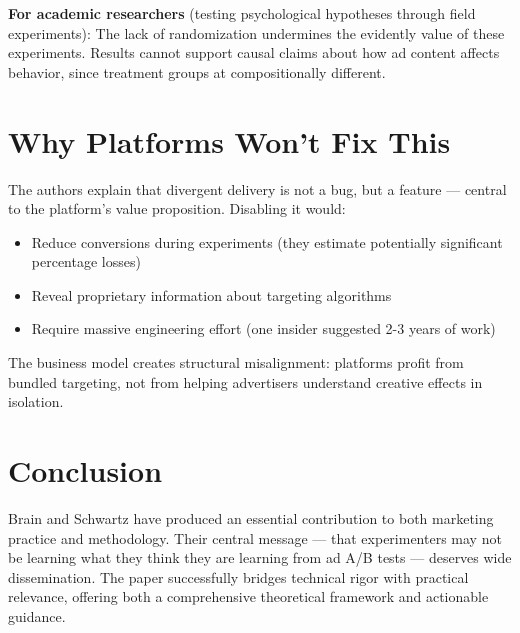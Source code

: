 \documentclass[10pt]{article}
\begin{document}
\textbf{For academic researchers} (testing psychological hypotheses through field experiments): The lack of randomization undermines the evidently value of these experiments. Results cannot support causal claims about how ad content affects behavior, since treatment groups at compositionally different. 

\section{Why Platforms Won't Fix This}
The authors explain that divergent delivery is not a bug, but a feature --- central to the platform's value proposition. Disabling it would: 
\begin{itemize}
    \item Reduce conversions during experiments (they estimate potentially significant percentage losses)
    \item Reveal proprietary information about targeting algorithms 
    \item Require massive engineering effort (one insider suggested 2-3 years of work)
\end{itemize}
The business model creates structural misalignment: platforms profit from bundled targeting, not from helping advertisers understand creative effects in isolation. 
\newpage 
\section{Conclusion}
Brain and Schwartz have produced an essential contribution to both marketing practice and methodology. Their central message --- that experimenters may not be learning what they think they are learning from ad A/B tests --- deserves wide dissemination. The paper successfully bridges technical rigor with practical relevance, offering both a comprehensive theoretical framework and actionable guidance.
\end{document}
